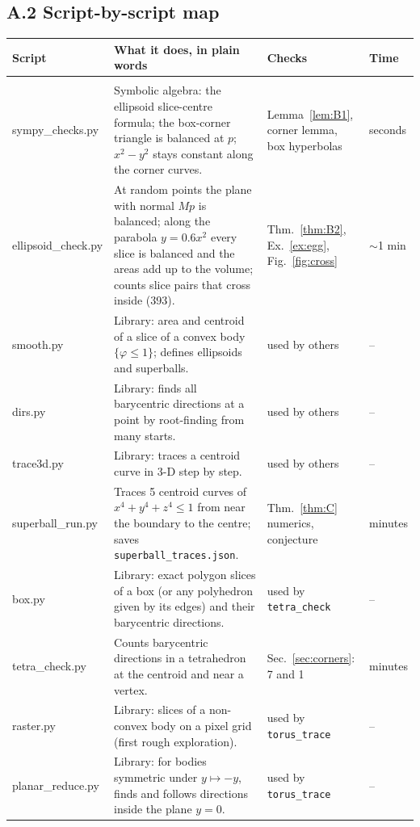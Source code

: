 \documentclass[11pt]{article}
\theoremstyle{plain}
\theoremstyle{definition}
\theoremstyle{remark}
\begin{document}
\subsection*{A.2 Script-by-script map}
{\footnotesize
\begin{xltabular}{\linewidth}{>{\ttfamily\raggedright\arraybackslash}p{3.4cm} >{\raggedright\arraybackslash}X >{\raggedright\arraybackslash}p{2.6cm} l}
\toprule
\normalfont\textbf{Script} & \textbf{What it does, in plain words} & \textbf{Checks} & \textbf{Time}\\
\midrule
\endhead
{}\\
sympy\_checks.py & Symbolic algebra: the ellipsoid slice-centre formula; the box-corner triangle is balanced at $p$; $x^2-y^2$ stays constant along the corner curves. & Lemma~\ref{lem:B1}, corner lemma, box hyperbolas & seconds\\
ellipsoid\_check.py & At random points the plane with normal $Mp$ is balanced; along the parabola $y=0.6x^2$ every slice is balanced and the areas add up to the volume; counts slice pairs that cross inside (393). & Thm.~\ref{thm:B2}, Ex.~\ref{ex:egg}, Fig.~\ref{fig:cross} & $\sim$1 min\\
smooth.py & Library: area and centroid of a slice of a convex body $\{\varphi\le1\}$; defines ellipsoids and superballs. & used by others & --\\
dirs.py & Library: finds all barycentric directions at a point by root-finding from many starts. & used by others & --\\
trace3d.py & Library: traces a centroid curve in 3-D step by step. & used by others & --\\
superball\_run.py & Traces 5 centroid curves of $x^4+y^4+z^4\le1$ from near the boundary to the centre; saves \texttt{superball\_traces.json}. & Thm.~\ref{thm:C} numerics, conjecture & minutes\\
box.py & Library: exact polygon slices of a box (or any polyhedron given by its edges) and their barycentric directions. & used by \texttt{tetra\_check} & --\\
tetra\_check.py & Counts barycentric directions in a tetrahedron at the centroid and near a vertex. & Sec.~\ref{sec:corners}: 7 and 1 & minutes\\
raster.py & Library: slices of a non-convex body on a pixel grid (first rough exploration). & used by \texttt{torus\_trace} & --\\
planar\_reduce.py & Library: for bodies symmetric under $y\mapsto-y$, finds and follows directions inside the plane $y=0$. & used by \texttt{torus\_trace} & --\\

\end{xltabular}}
\end{document}
